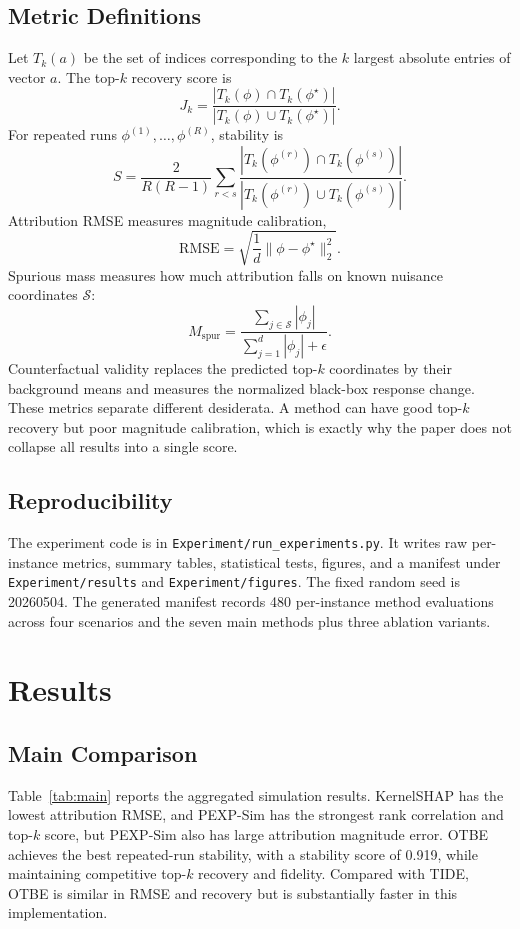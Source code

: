 \documentclass[10pt,conference,letterpaper]{IEEEtran}
\newcommand{\method}{OTBE}
\begin{document}
\subsection{Metric Definitions}
Let $T_k(a)$ be the set of indices corresponding to the $k$ largest absolute entries of vector $a$.  The top-$k$ recovery score is
\begin{equation}
    J_k=\frac{|T_k(\phi)\cap T_k(\phi^\star)|}{|T_k(\phi)\cup T_k(\phi^\star)|}.
\end{equation}
For repeated runs $\phi^{(1)},\ldots,\phi^{(R)}$, stability is
\begin{equation}
    S=\frac{2}{R(R-1)}\sum_{r<s}\frac{|T_k(\phi^{(r)})\cap T_k(\phi^{(s)})|}{|T_k(\phi^{(r)})\cup T_k(\phi^{(s)})|}.
\end{equation}
Attribution RMSE measures magnitude calibration,
\begin{equation}
    \mathrm{RMSE}=\sqrt{\frac{1}{d}\|\phi-\phi^\star\|_2^2}.
\end{equation}
Spurious mass measures how much attribution falls on known nuisance coordinates $\mathcal{S}$:
\begin{equation}
    M_{\mathrm{spur}}=\frac{\sum_{j\in\mathcal{S}}|\phi_j|}{\sum_{j=1}^{d}|\phi_j|+\epsilon}.
\end{equation}
Counterfactual validity replaces the predicted top-$k$ coordinates by their background means and measures the normalized black-box response change.  These metrics separate different desiderata.  A method can have good top-$k$ recovery but poor magnitude calibration, which is exactly why the paper does not collapse all results into a single score.

\subsection{Reproducibility}
The experiment code is in \texttt{Experiment/run\_experiments.py}.  It writes raw per-instance metrics, summary tables, statistical tests, figures, and a manifest under \texttt{Experiment/results} and \texttt{Experiment/figures}.  The fixed random seed is 20260504.  The generated manifest records 480 per-instance method evaluations across four scenarios and the seven main methods plus three ablation variants.

\section{Results}

\subsection{Main Comparison}
Table~\ref{tab:main} reports the aggregated simulation results.  KernelSHAP has the lowest attribution RMSE, and PEXP-Sim has the strongest rank correlation and top-$k$ score, but PEXP-Sim also has large attribution magnitude error.  \method{} achieves the best repeated-run stability, with a stability score of 0.919, while maintaining competitive top-$k$ recovery and fidelity.  Compared with TIDE, \method{} is similar in RMSE and recovery but is substantially faster in this implementation.
\end{document}
